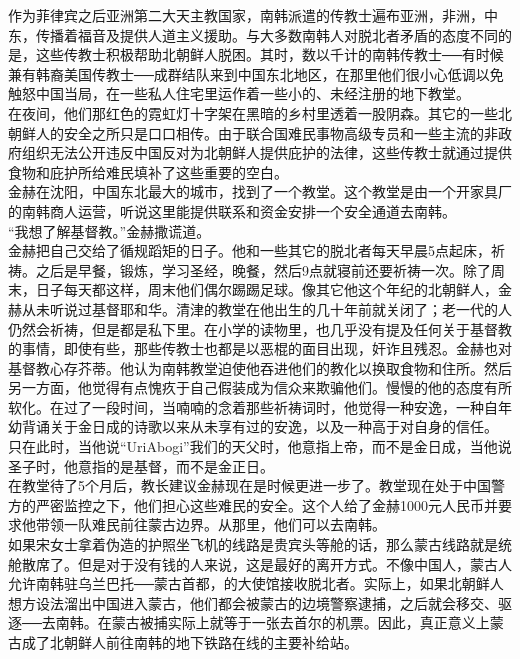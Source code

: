 作为菲律宾之后亚洲第二大天主教国家，南韩派遣的传教士遍布亚洲，非洲，中东，传播着福音及提供人道主义援助。与大多数南韩人对脱北者矛盾的态度不同的是，这些传教士积极帮助北朝鲜人脱困。其时，数以千计的南韩传教士──有时候兼有韩裔美国传教士──成群结队来到中国东北地区，在那里他们很小心低调以免触怒中国当局，在一些私人住宅里运作着一些小的、未经注册的地下教堂。\\

在夜间，他们那红色的霓虹灯十字架在黑暗的乡村里透着一股阴森。其它的一些北朝鲜人的安全之所只是口口相传。由于联合国难民事物高级专员和一些主流的非政府组织无法公开违反中国反对为北朝鲜人提供庇护的法律，这些传教士就通过提供食物和庇护所给难民填补了这些重要的空白。\\

金赫在沈阳，中国东北最大的城市，找到了一个教堂。这个教堂是由一个开家具厂的南韩商人运营，听说这里能提供联系和资金安排一个安全通道去南韩。\\

“我想了解基督教。”金赫撒谎道。\\

金赫把自己交给了循规蹈矩的日子。他和一些其它的脱北者每天早晨5点起床，祈祷。之后是早餐，锻炼，学习圣经，晚餐，然后9点就寝前还要祈祷一次。除了周末，日子每天都这样，周末他们偶尔踢踢足球。像其它他这个年纪的北朝鲜人，金赫从未听说过基督耶和华。清津的教堂在他出生的几十年前就关闭了；老一代的人仍然会祈祷，但是都是私下里。在小学的读物里，也几乎没有提及任何关于基督教的事情，即使有些，那些传教士也都是以恶棍的面目出现，奸诈且残忍。金赫也对基督教心存芥蒂。他认为南韩教堂迫使他吞进他们的教化以换取食物和住所。然后另一方面，他觉得有点愧疚于自己假装成为信众来欺骗他们。慢慢的他的态度有所软化。在过了一段时间，当喃喃的念着那些祈祷词时，他觉得一种安逸，一种自年幼背诵关于金日成的诗歌以来从未享有过的安逸，以及一种高于对自身的信任。\\

只在此时，当他说“UriAbogi”我们的天父时，他意指上帝，而不是金日成，当他说圣子时，他意指的是基督，而不是金正日。\\

在教堂待了5个月后，教长建议金赫现在是时候更进一步了。教堂现在处于中国警方的严密监控之下，他们担心这些难民的安全。这个人给了金赫1000元人民币并要求他带领一队难民前往蒙古边界。从那里，他们可以去南韩。\\

如果宋女士拿着伪造的护照坐飞机的线路是贵宾头等舱的话，那么蒙古线路就是统舱散席了。但是对于没有钱的人来说，这是最好的离开方式。不像中国人，蒙古人允许南韩驻乌兰巴托──蒙古首都，的大使馆接收脱北者。实际上，如果北朝鲜人想方设法溜出中国进入蒙古，他们都会被蒙古的边境警察逮捕，之后就会移交、驱逐──去南韩。在蒙古被捕实际上就等于一张去首尔的机票。因此，真正意义上蒙古成了北朝鲜人前往南韩的地下铁路在线的主要补给站。\\

